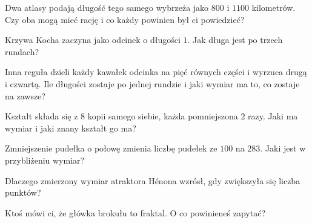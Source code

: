 \canyou

\begin{checkpoint}
\item Dwa atlasy podają długość tego samego wybrzeża jako $800$ i $1100$
  kilometrów. Czy oba mogą mieć rację i co każdy powinien był ci powiedzieć?
\item Krzywa Kocha zaczyna jako odcinek o długości $1$. Jak długa jest po
  trzech rundach?
\item Inna reguła dzieli każdy kawałek odcinka na pięć równych części i
  wyrzuca drugą i czwartą. Ile długości zostaje po jednej rundzie i jaki
  wymiar ma to, co zostaje na zawsze?
\item Kształt składa się z $8$ kopii samego siebie, każda pomniejszona
  $2$ razy. Jaki ma wymiar i jaki znany kształt go ma?
\item Zmniejszenie pudełka o połowę zmienia liczbę pudełek ze $100$ na
  $283$. Jaki jest w przybliżeniu wymiar?
\item Dlaczego zmierzony wymiar atraktora Hénona wzrósł, gdy zwiększyła się
  liczba punktów?
\item Ktoś mówi ci, że główka brokułu to fraktal. O co powinieneś zapytać?
\end{checkpoint}
